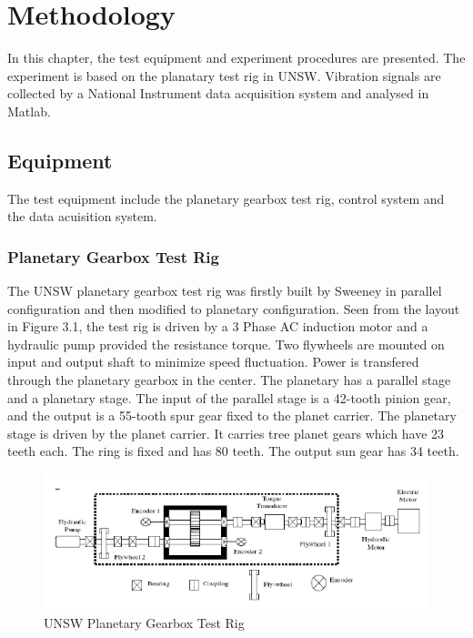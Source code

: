 \chapter{Methodology}\label{ch:methodology}

In this chapter, the test equipment and experiment procedures are presented. The experiment is based on the planatary test rig in UNSW. Vibration signals are collected by a National Instrument data acquisition system and analysed in Matlab.

\section{Equipment}

The test equipment include the planetary gearbox test rig, control system and the data acuisition system.

\subsection{Planetary Gearbox Test Rig}

The UNSW planetary gearbox test rig was firstly built by Sweeney in parallel configuration and then modified to planetary configuration. Seen from the layout in Figure 3.1, the test rig is driven by a 3 Phase AC induction motor and a hydraulic pump provided the resistance torque. Two flywheels are mounted on input and output shaft to minimize speed fluctuation.
Power is transfered through the planetary gearbox in the center. The planetary has a parallel stage and a planetary stage. The input of the parallel stage is a 42-tooth pinion gear, and the output is a 55-tooth spur gear fixed to the planet carrier. The planetary stage is driven by the planet carrier. It carries tree planet gears which have 23 teeth each. The ring is fixed and has 80 teeth. The output sun gear has 34 teeth.

\begin{figure}
	\centering
	\includegraphics{rig}
	\caption{UNSW Planetary Gearbox Test Rig}
	\label{testrig}
\end{figure}

